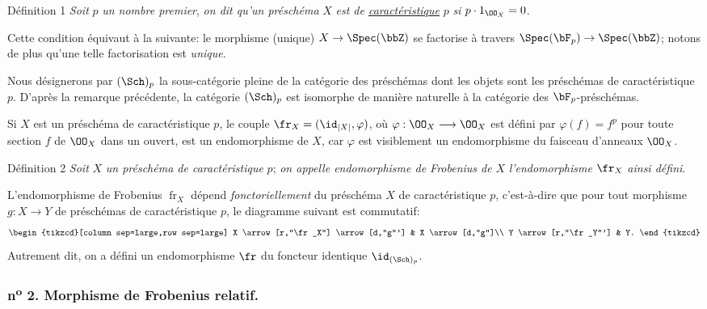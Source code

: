 \begin{statement}{Définition 1}
\emph{Soit} $p$ \emph{un nombre premier}, \emph{on dit qu'un préschéma} $X$ \emph{est de \underline{caractéristique}} $p$ \emph{si} $p\cdot 1_{\OO_X}=0$.
\end{statement}

Cette condition équivaut à la suivante: le morphisme (unique) $X\to\Spec(\bbZ)$ se factorise à travers $\Spec(\bF_p)\to\Spec(\bbZ)$; notons de plus qu'une telle factorisation est \emph{unique}.

Nous désignerons par $(\Sch)_p$ la sous-catégorie pleine de la catégorie des préschémas dont les objets sont les préschémas de caractéristique $p$. D'après la remarque précédente, la catégorie $(\Sch)_p$ est isomorphe de manière naturelle à la catégorie des $\bF_p$-préschémas.

Si $X$ est un préschéma de caractéristique $p$, le couple $\fr_X=(\id_{|X|},\varphi)$, où $\varphi:\OO_X\longrightarrow\OO_X$ est défini par $\varphi(f)=f^p$ pour toute section $f$ de $\OO_X$ dans un ouvert, est un endomorphisme de $X$, car $\varphi$ est visiblement un endomorphisme du faisceau d'anneaux $\OO_X$.

\begin{statement}{Définition 2}
\emph{Soit} $X$ \emph{un préschéma de caractéristique} $p$; \emph{on appelle endomorphisme de Frobenius de} $X$ \emph{l'endomorphisme} $\fr_X$ \emph{ainsi défini}.
\end{statement}

L'endomorphisme de Frobenius $\operatorname{fr}_X$ dépend \emph{fonctoriellement} du préschéma $X$ de caractéristique $p$, c'est-à-dire que pour tout morphisme $g:X\to Y$ de préschémas de caractéristique $p$, le diagramme suivant est commutatif:
\[
\begin{tikzcd}[column sep=large,row sep=large]
X \arrow[r,"\fr_X"] \arrow[d,"g"'] & X \arrow[d,"g"]\\
Y \arrow[r,"\fr_Y"'] & Y.
\end{tikzcd}
\]
Autrement dit, on a défini un endomorphisme $\fr$ du foncteur identique $\id_{(\Sch)_p}$.

\subsubsection*{n\textsuperscript{o} 2. Morphisme de Frobenius relatif.}

